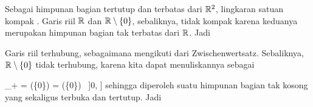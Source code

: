 Sebagai himpunan bagian tertutup dan terbatas dari ${\mathbb R}^2$, lingkaran satuan kompak
 {} {.} Garis riil ${\mathbb R}$ dan ${\mathbb R} \setminus \{0\}$, sebaliknya, tidak kompak karena keduanya merupakan himpunan bagian tak terbatas dari ${\mathbb R}$. Jadi

Garis riil terhubung, sebagaimana mengikuti dari
Zwischenwertsatz.
Sebaliknya, ${\mathbb R} \setminus \{0\}$ tidak terhubung, karena kita dapat menuliskannya sebagai

\mavergleichskettedisp
{\vergleichskette
{\R_+
}
{ =} { (\R \setminus \{0\}) \cap [0, \infty]
}
{ =} { (\R \setminus \{0\}) \cap \, ]0, \infty]
}
{ } {
}
{ } {
}
}
{}{}{}
sehingga diperoleh suatu himpunan bagian tak kosong yang sekaligus terbuka dan tertutup. Jadi
